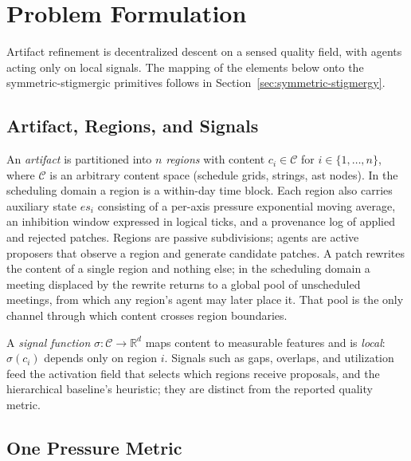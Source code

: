 
\section{Problem Formulation}
\label{sec:problem-formulation}

Artifact refinement is decentralized descent on a sensed quality field, with agents acting only on local signals. The mapping of the elements below onto the symmetric-stigmergic primitives follows in Section~\ref{sec:symmetric-stigmergy}.

\subsection{Artifact, Regions, and Signals}

An \emph{artifact} is partitioned into $n$ \emph{regions} with content $c_i \in \mathcal{C}$ for $i \in \{1, \ldots, n\}$, where $\mathcal{C}$ is an arbitrary content space (schedule grids, strings, \ac{ast} nodes). In the scheduling domain a region is a within-day time block. Each region also carries auxiliary state $es_i$ consisting of a per-axis pressure exponential moving average, an inhibition window expressed in logical ticks, and a provenance log of applied and rejected patches. Regions are passive subdivisions; agents are active proposers that observe a region and generate candidate patches. A patch rewrites the content of a single region and nothing else; in the scheduling domain a meeting displaced by the rewrite returns to a global pool of unscheduled meetings, from which any region's agent may later place it. That pool is the only channel through which content crosses region boundaries.

A \emph{signal function} $\sigma: \mathcal{C} \to \mathbb{R}^d$ maps content to measurable features and is \emph{local}: $\sigma(c_i)$ depends only on region $i$. Signals such as gaps, overlaps, and utilization feed the activation field that selects which regions receive proposals, and the hierarchical baseline's heuristic; they are distinct from the reported quality metric.

\subsection{One Pressure Metric}

